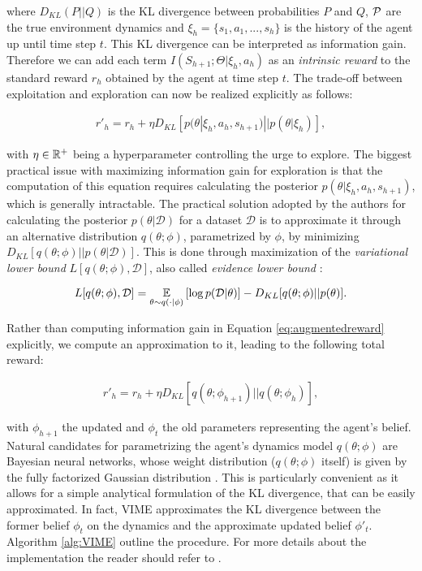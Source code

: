 where $D_{KL}(P||Q)$ is the \gls{KL} divergence between probabilities $P$ and $Q$, $\mathcal{P}$ are the true environment dynamics and $\xi_h=\{s_1,a_1,...,s_h\}$ is the history of the agent up until time step $t$. This \gls{KL} divergence can be interpreted as information gain. Therefore we can add each term $I(S_{h+1};\Theta|\xi_h,a_h)$ as an \emph{intrinsic reward} to the standard reward $r_h$ obtained by the agent at time step $t$. The trade-off between exploitation and
exploration can now be realized explicitly as follows:

\begin{align}
r'_h = r_h + \eta D_{KL}[p(\theta|\xi_h,a_h,s_{h+1})||p(\theta|\xi_h)], \label{eq:augmentedreward}
\end{align}
 
with $\eta\in\mathbb{R}^+$ being a hyperparameter controlling the urge to explore. The biggest practical
issue with maximizing information gain for exploration is that the computation of this equation requires calculating the posterior $p(\theta|\xi_h,a_h,s_{h+1})$, which is generally intractable. The practical solution adopted by the authors for calculating the posterior $p(\theta|\mathcal{D})$ for a dataset $\mathcal{D}$ is to approximate it through an alternative distribution $q(\theta;\phi)$, parametrized by $\phi$, by minimizing $D_{KL}[q(\theta;\phi)||p(\theta|\mathcal{D})]$. This is done through maximization of the \emph{variational lower bound} $L[q(\theta;\phi),\mathcal{D}]$, also called \emph{evidence lower bound} \cite{blei2017variational}:

\begin{align}
L[q(\theta;\phi),\mathcal{D}] = \underset{\theta\sim q(\cdot|\phi)}{\mathbb{E}}\left[{\log p(\mathcal{D}|\theta)}\right]-D_{KL}[q(\theta;\phi)||p(\theta)]. \label{eq:elb}
\end{align}

Rather than computing information gain in Equation \ref{eq:augmentedreward} explicitly, we compute an approximation to it, leading to the following total reward:

\begin{align}
r'_h = r_h + \eta D_{KL}[q(\theta;\phi_{h+1})||q(\theta;\phi_h)],
\end{align}

with $\phi_{h+1}$ the updated and $\phi_{t}$ the old parameters representing the agent’s belief. Natural candidates for parametrizing the agent’s dynamics model $q(\theta;\phi)$ are Bayesian neural networks, whose weight distribution ($q(\theta;\phi)$ itself) is given by the fully factorized Gaussian distribution \cite{blundell2015weight}. This is particularly convenient as it allows for a simple analytical formulation of the KL divergence, that can be easily approximated. In fact, \gls{VIME} approximates the KL divergence between the former belief $\phi_{t}$ on the dynamics and the approximate updated belief $\phi'_{t}$. Algorithm \ref{alg:VIME} outline the procedure. For more details about the implementation the reader should refer to \cite{houthooft2016vime}. 


